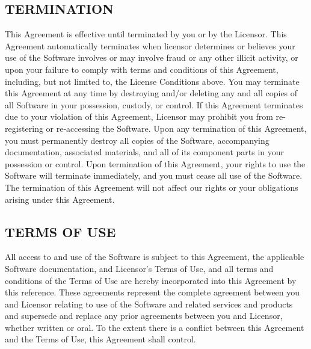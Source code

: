 \documentclass[11pt]{article}
\begin{document}
\subsection*{TERMINATION}
This Agreement is effective until terminated by you or by the Licensor. This Agreement automatically terminates when licensor determines or believes your use of the Software involves or may involve fraud or any other illicit activity, or upon your failure to comply with terms and conditions of this Agreement, including, but not limited to, the License Conditions above. You may terminate this Agreement at any time by destroying and/or deleting any and all copies of all Software in your possession, custody, or control. If this Agreement terminates due to your violation of this Agreement, Licensor may prohibit you from re-registering or re-accessing the Software. Upon any termination of this Agreement, you must permanently destroy all copies of the Software, accompanying documentation, associated materials, and all of its component parts in your possession or control. Upon termination of this Agreement, your rights to use the Software will terminate immediately, and you must cease all use of the Software. The termination of this Agreement will not affect our rights or your obligations arising under this Agreement.

\subsection*{TERMS OF USE}
All access to and use of the Software is subject to this Agreement, the applicable Software documentation, and Licensor's Terms of Use, and all terms and conditions of the Terms of Use are hereby incorporated into this Agreement by this reference. These agreements represent the complete agreement between you and Licensor relating to use of the Software and related services and products and supersede and replace any prior agreements between you and Licensor, whether written or oral. To the extent there is a conflict between this Agreement and the Terms of Use, this Agreement shall control.
\end{document}
